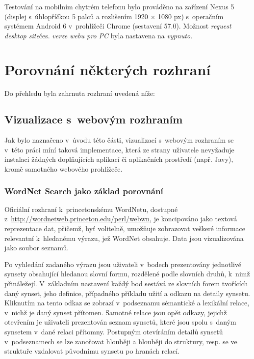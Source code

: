 \documentclass[a4paper,11pt,openany,twoside]{book}
\newcommand\ex{\textsf}
\begin{document}
				Testování na mobilním chytrém telefonu bylo prováděno na zařízení Nexus 5 (displej s~úhlopříčkou 5 palců a rozlišením 1920 × 1080 px) s~operačním systémem Android 6 v~prohlížeči Chrome (sestavení 57.0). Možnost \textit{request desktop site}\ex{čes. \textit{verze webu pro PC}} byla nastavena na \textit{vypnuto}.

		\chapter{Porovnání některých rozhraní}
		\label{cha:porovnani}
			
			Do přehledu byla zahrnuta rozhraní uvedená níže:

			\minitoc %

			

			\section{Vizualizace s~webovým rozhraním}

				Jak bylo naznačeno v~úvodu této části, vizualizací s~webovým rozhraním se v~této práci míní taková implementace, která ze strany uživatele nevyžaduje instalaci žádných doplňujících aplikací či aplikačních prostředí (např. Javy), kromě samotného webového prohlížeče.

				\subsection{WordNet Search jako základ porovnání}
				\label{wnvis:wnsearch}

					Oficiální rozhraní k~princetonskému WordNetu, dostupné z~\url{http://wordnetweb.princeton.edu/perl/webwn}, je koncipováno jako textová reprezentace dat, přičemž, byť volitelně, umožňuje zobrazovat veškeré informace relevantní k~hledanému výrazu, jež WordNet obsahuje. Data jsou vizualizována jako soubor seznamů.

					Po vyhledání zadaného výrazu jsou uživateli v~bodech prezentovány jednotlivé synsety obsahující hledanou slovní formu, rozdělené podle slovních druhů, k~nimž přináležejí. V~základním nastavení každý bod sestává ze slovních forem tvořících daný synset, jeho definice, případného příkladu užití a odkazu na detaily synsetu. Kliknutím na tento odkaz se zobrazí v~podseznamu sémantické a lexikální relace, v~nichž je daný synset přítomen. Samotné relace jsou opět odkazy, jejichž otevřením je uživateli prezentován seznam synsetů, které jsou spolu s~daným synsetem v~dané relaci přítomny. Postupným otevíráním detailů synsetů v~podseznamech se lze zanořovat hlouběji a hlouběji do struktury, resp. se ve struktuře vzdalovat původnímu synsetu po hranách relací.
\end{document}
